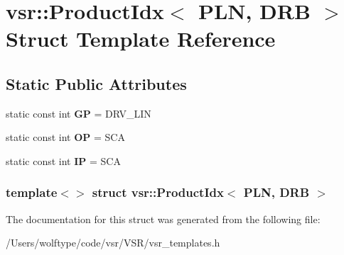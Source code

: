 \hypertarget{structvsr_1_1_product_idx_3_01_p_l_n_00_01_d_r_b_01_4}{\section{vsr\-:\-:Product\-Idx$<$ P\-L\-N, D\-R\-B $>$ Struct Template Reference}
\label{structvsr_1_1_product_idx_3_01_p_l_n_00_01_d_r_b_01_4}
}
\subsection*{Static Public Attributes}
\begin{DoxyCompactItemize}
\item 
\hypertarget{structvsr_1_1_product_idx_3_01_p_l_n_00_01_d_r_b_01_4_a9011db39b8bf5f9d38cf170080698db7}{static const int {\bfseries G\-P} = D\-R\-V\-\_\-\-L\-I\-N}\label{structvsr_1_1_product_idx_3_01_p_l_n_00_01_d_r_b_01_4_a9011db39b8bf5f9d38cf170080698db7}

\item 
\hypertarget{structvsr_1_1_product_idx_3_01_p_l_n_00_01_d_r_b_01_4_a421879469db229c1b99f83706cd6d3b5}{static const int {\bfseries O\-P} = S\-C\-A}\label{structvsr_1_1_product_idx_3_01_p_l_n_00_01_d_r_b_01_4_a421879469db229c1b99f83706cd6d3b5}

\item 
\hypertarget{structvsr_1_1_product_idx_3_01_p_l_n_00_01_d_r_b_01_4_a786f6ccfb5e6e5e47f85f1b4c14bf7f8}{static const int {\bfseries I\-P} = S\-C\-A}\label{structvsr_1_1_product_idx_3_01_p_l_n_00_01_d_r_b_01_4_a786f6ccfb5e6e5e47f85f1b4c14bf7f8}

\end{DoxyCompactItemize}
\subsubsection*{template$<$$>$ struct vsr\-::\-Product\-Idx$<$ P\-L\-N, D\-R\-B $>$}



The documentation for this struct was generated from the following file\-:\begin{DoxyCompactItemize}
\item 
/\-Users/wolftype/code/vsr/\-V\-S\-R/vsr\-\_\-templates.\-h\end{DoxyCompactItemize}
